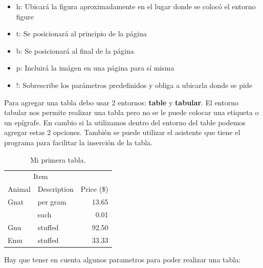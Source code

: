 \documentclass[a4paper,12pt]{article} %
\begin{document}
\begin{itemize}
\item{h: Ubicará la figura aproximadamente en el lugar donde se colocó el entorno figure}
\item{t: Se posicionará al principio de la página}
\item{b: Se posicionará al final de la página}
\item{p: Incluirá la imágen en una página para sí misma}
\item{!: Sobrescribe los parámetros predefinidos y obliga a ubicarla donde se pide}
\end{itemize}

Para agregar una tabla debo usar 2 entornos: \textbf{table} y \textbf{tabular}. El entorno tabular nos permite realizar una tabla pero no se le puede colocar una etiqueta o un epígrafe. En cambio si la utilizamos dentro del entorno del table podemos agregar estas 2 opciones. También se puede utilizar el asistente que tiene el programa para facilitar la inserción de la tabla.

\begin{table}[h] %
 \centering %
 \begin{tabular}{ll|r} %
  \hline
  \multicolumn{2}{c|}{Item} \\
  \cline{1-2}
  Animal    & Description & Price (\$) \\
  \hline
  Gnat      & per gram    & 13.65      \\
            & each        & 0.01       \\
  Gnu       & stuffed     & 92.50      \\
  Emu       & stuffed     & 33.33      \\
  \hline
 \end{tabular}
 \caption{Mi primera tabla.}
 \label{tab:tabla1}
\end{table}
Hay que tener en cuenta algunos parametros para poder realizar una tabla:
\end{document}
